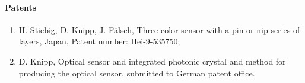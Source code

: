 \paragraph{Patents}
\begin{enumerate}
\item H. Stiebig, D. Knipp, J. F\"alsch, Three-color sensor with a pin or nip series of
  layers, Japan, Patent number: Hei-9-535750;
\item D. Knipp, Optical sensor and integrated photonic crystal and method for producing
  the optical sensor, submitted to German patent office.
\end{enumerate}

\nocite{Knipp1, Knipp2, Knipp3, Knipp4, Knipp5, Knipp6, Knipp7, Knipp8, Knipp9,
Knipp10, Knipp11}
